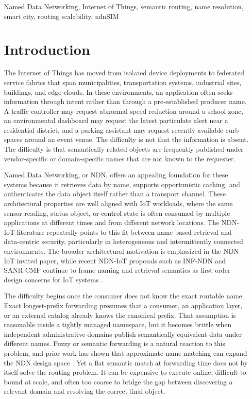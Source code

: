 \documentclass[journal]{IEEEtran}
\begin{document}
\begin{IEEEkeywords}
Named Data Networking, Internet of Things, semantic routing, name resolution, smart city, routing scalability, ndnSIM
\end{IEEEkeywords}

\section{Introduction}

The Internet of Things has moved from isolated device deployments to federated service fabrics that span municipalities, transportation systems, industrial sites, buildings, and edge clouds. In these environments, an application often seeks information through intent rather than through a pre-established producer name. A traffic controller may request abnormal speed reduction around a school zone, an environmental dashboard may request the latest particulate alert near a residential district, and a parking assistant may request recently available curb spaces around an event venue. The difficulty is not that the information is absent. The difficulty is that semantically related objects are frequently published under vendor-specific or domain-specific names that are not known to the requester.

Named Data Networking, or NDN, offers an appealing foundation for these systems because it retrieves data by name, supports opportunistic caching, and authenticates the data object itself rather than a transport channel. These architectural properties are well aligned with IoT workloads, where the same sensor reading, status object, or control state is often consumed by multiple applications at different times and from different network locations. The NDN-IoT literature repeatedly points to this fit between name-based retrieval and data-centric security, particularly in heterogeneous and intermittently connected environments. The broader architectural motivation is emphasized in the NDN-IoT invited paper, while recent NDN-IoT proposals such as INF-NDN and SANR-CMF continue to frame naming and retrieval semantics as first-order design concerns for IoT systems \cite{ndn_iot_invited,inf_ndn,sanr}.

The difficulty begins once the consumer does not know the exact routable name. Exact longest-prefix forwarding presumes that a consumer, an application layer, or an external catalog already knows the canonical prefix. That assumption is reasonable inside a tightly managed namespace, but it becomes brittle when independent administrative domains publish semantically equivalent data under different names. Fuzzy or semantic forwarding is a natural reaction to this problem, and prior work has shown that approximate name matching can expand the NDN design space \cite{fuzzy,semantic_distribution}. Yet a flat semantic match at forwarding time does not by itself solve the routing problem. It can be expensive to execute online, difficult to bound at scale, and often too coarse to bridge the gap between discovering a relevant domain and resolving the correct final object.
\end{document}
